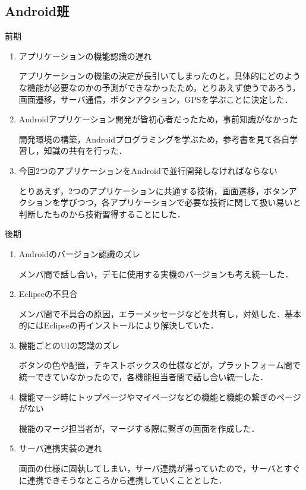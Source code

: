\subsection{Android班}
前期

\begin{enumerate}
\item アプリケーションの機能認識の遅れ
\par
アプリケーションの機能の決定が長引いてしまったのと，具体的にどのような機能が必要なのかの予測ができなかったため，とりあえず使うであろう，画面遷移，サーバ通信，ボタンアクション，GPSを学ぶことに決定した．
\item Androidアプリケーション開発が皆初心者だったため，事前知識がなかった
\par
開発環境の構築，Androidプログラミングを学ぶため，参考書を見て各自学習し，知識の共有を行った．
\item 今回2つのアプリケーションをAndroidで並行開発しなければならない
\par
とりあえず，2つのアプリケーションに共通する技術，画面遷移，ボタンアクションを学びつつ，各アプリケーションで必要な技術に関して扱い易いと判断したものから技術習得することにした．
\end{enumerate}

後期

\begin{enumerate}
\item Androidのバージョン認識のズレ
\par
メンバ間で話し合い，デモに使用する実機のバージョンも考え統一した．
\item Eclipseの不具合
\par
メンバ間で不具合の原因，エラーメッセージなどを共有し，対処した．基本的にはEclipseの再インストールにより解決していた．
\item 機能ごとのUIの認識のズレ
\par
ボタンの色や配置，テキストボックスの仕様などが，プラットフォーム間で統一できていなかったので，各機能担当者間で話し合い統一した．
\item 機能マージ時にトップページやマイページなどの機能と機能の繋ぎのページがない
\par
機能のマージ担当者が，マージする際に繋ぎの画面を作成した．
\item サーバ連携実装の遅れ
\par
画面の仕様に固執してしまい，サーバ連携が滞っていたので，サーバとすぐに連携できそうなところから連携していくこととした．
\end{enumerate}
